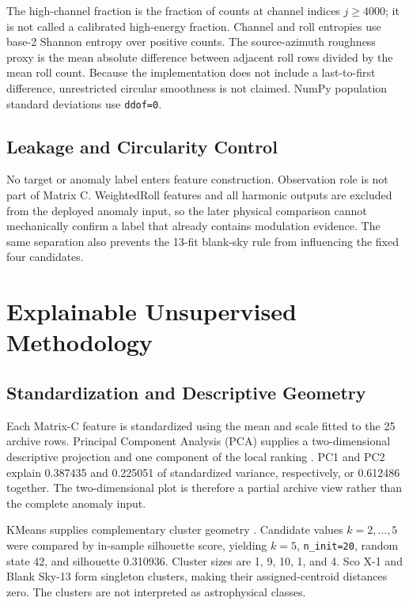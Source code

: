 \documentclass[conference]{IEEEtran}
\begin{document}
The high-channel fraction is the fraction of counts at channel indices $j\ge4000$; it is not called a calibrated high-energy fraction. Channel and roll entropies use base-2 Shannon entropy over positive counts. The source-azimuth roughness proxy is the mean absolute difference between adjacent roll rows divided by the mean roll count. Because the implementation does not include a last-to-first difference, unrestricted circular smoothness is not claimed. NumPy population standard deviations use \texttt{ddof=0}.


\subsection{Leakage and Circularity Control}

No target or anomaly label enters feature construction. Observation role is not part of Matrix C. WeightedRoll features and all harmonic outputs are excluded from the deployed anomaly input, so the later physical comparison cannot mechanically confirm a label that already contains modulation evidence. The same separation also prevents the 13-fit blank-sky rule from influencing the fixed four candidates.


\section{Explainable Unsupervised Methodology}

\subsection{Standardization and Descriptive Geometry}

Each Matrix-C feature is standardized using the mean and scale fitted to the 25 archive rows. Principal Component Analysis (PCA) supplies a two-dimensional descriptive projection and one component of the local ranking \cite{pearson1901pca}. PC1 and PC2 explain 0.387435 and 0.225051 of standardized variance, respectively, or 0.612486 together. The two-dimensional plot is therefore a partial archive view rather than the complete anomaly input.


KMeans supplies complementary cluster geometry \cite{macqueen1967kmeans}. Candidate values $k=2,\ldots,5$ were compared by in-sample silhouette score, yielding $k=5$, \texttt{n\_init=20}, random state 42, and silhouette 0.310936. Cluster sizes are 1, 9, 10, 1, and 4. Sco X-1 and Blank Sky-13 form singleton clusters, making their assigned-centroid distances zero. The clusters are not interpreted as astrophysical classes.
\end{document}
